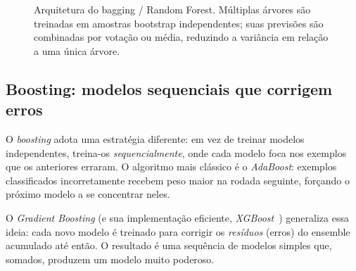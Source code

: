\documentclass[12pt,a4paper]{article}
\begin{document}
\begin{figure}[htb]
\centering
{}
\caption{Arquitetura do bagging / Random Forest. Múltiplas árvores são treinadas em amostras bootstrap independentes; suas previsões são combinadas por votação ou média, reduzindo a variância em relação a uma única árvore.}
\label{fig:random-forest}
\end{figure}

\subsection{Boosting: modelos sequenciais que corrigem erros}

O \emph{boosting} adota uma estratégia diferente: em vez de treinar modelos independentes, treina-os \emph{sequencialmente}, onde cada modelo foca nos exemplos que os anteriores erraram. O algoritmo mais clássico é o \emph{AdaBoost}: exemplos classificados incorretamente recebem peso maior na rodada seguinte, forçando o próximo modelo a se concentrar neles.

O \emph{Gradient Boosting} (e sua implementação eficiente, \emph{XGBoost}~\citep{chen2016xgboost}) generaliza essa ideia: cada novo modelo é treinado para corrigir os \emph{resíduos} (erros) do ensemble acumulado até então. O resultado é uma sequência de modelos simples que, somados, produzem um modelo muito poderoso.
\end{document}
